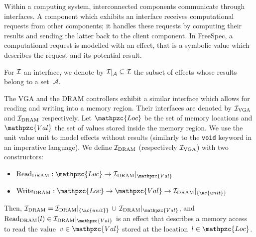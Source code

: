 Within a computing system, interconnected components communicate through
interfaces.
%
A component which exhibits an interface receives computational requests from
other components; it handles these requests by computing their results and
sending the latter back to the client component.
%
In FreeSpec, a computational request is modelled with an effect, that is a
symbolic value which describes the request and its potential result.

For $\mathcal{I}$ an interface, we denote by $\mathcal{I}|_{\mathcal{A}} \subseteq \mathcal{I}$
the subset of effects whose results belong to a set~$\mathcal{A}$.

\begin{example}
  The VGA and the DRAM controllers exhibit a similar interface which allows for
  reading and writing into a memory region.
  Their interfaces are denoted by $\mathcal{I}_{\mathrm{VGA}}$ and $\mathcal{I}_{\mathrm{DRAM}}$
  respectively.
  Let $\mathpzc{Loc}$ be the set of memory locations and $\mathpzc{Val}$ the set
  of values stored inside the memory region.
  We use the unit value \ac{unit} to model effects without results (similarly to
  the \texttt{void} keyword in an imperative language).
  We define $\mathcal{I}_{\mathrm{DRAM}}$ (respectively $\mathcal{I}_{\mathrm{VGA}}$) with two
  constructors:
  \begin{itemize}
  \item
    $\func{Read}_{\mathrm{DRAM}} : \mathpzc{Loc} \rightarrow
    \Interface{\I_{\mathrm{DRAM}}}{\mathpzc{Val}}$
  \item
    $\func{Write}_{\mathrm{DRAM}} : \mathpzc{Loc} \rightarrow \mathpzc{Val}
    \rightarrow \Interface{\I_{\mathrm{DRAM}}}{\{\ac{unit}\}}$
  \end{itemize}

  Then,
  $\I_{\mathrm{DRAM}} =
  \Interface{\I_{\mathrm{DRAM}}}{\{\ac{unit}\}}\,\cup\,\Interface{\I_{\mathrm{DRAM}}}{\mathpzc{Val}}$,
  and
  $\func{Read}_{\mathrm{DRAM}}(l) \in
  \Interface{\I_{\mathrm{DRAM}}}{\mathpzc{Val}}$ is an effect that describes a
  memory access to read the value~$v \in \mathpzc{Val}$ stored at the
  location~$l \in \mathpzc{Loc}$.


\end{example}
